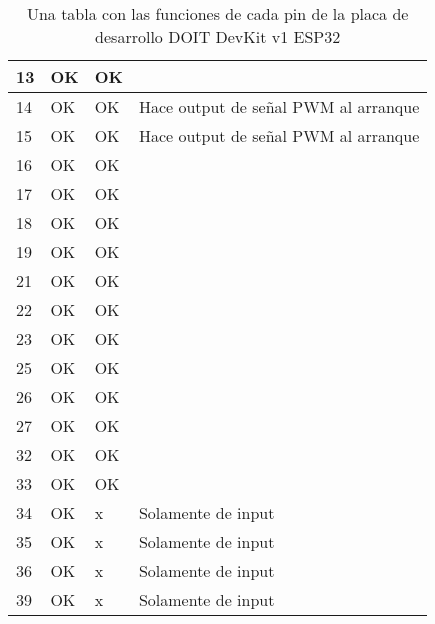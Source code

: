 \documentclass[../informe_krapp.tex]{subfiles}
\begin{document}
\begin{table}[!ht]
\begin{tabular}{|l|l|l|l|}
		13   & OK        & OK     & ~                                          \\ \hline
		14   & OK        & OK     & Hace output de señal PWM al arranque       \\ \hline
		15   & OK        & OK     & Hace output de señal PWM al arranque       \\ \hline
		16   & OK        & OK     & ~                                          \\ \hline
		17   & OK        & OK     & ~                                          \\ \hline
		18   & OK        & OK     & ~                                          \\ \hline
		19   & OK        & OK     & ~                                          \\ \hline
		21   & OK        & OK     & ~                                          \\ \hline
		22   & OK        & OK     & ~                                          \\ \hline
		23   & OK        & OK     & ~                                          \\ \hline
		25   & OK        & OK     & ~                                          \\ \hline
		26   & OK        & OK     & ~                                          \\ \hline
		27   & OK        & OK     & ~                                          \\ \hline
		32   & OK        & OK     & ~                                          \\ \hline
		33   & OK        & OK     & ~                                          \\ \hline
		34   & OK        & x      & Solamente de input                         \\ \hline
		35   & OK        & x      & Solamente de input                         \\ \hline
		36   & OK        & x      & Solamente de input                         \\ \hline
		39   & OK        & x      & Solamente de input                         \\ \hline
	\end{tabular}
	\caption{Una tabla con las funciones de cada pin de la placa de desarrollo
		DOIT DevKit v1 ESP32}
	\label{tabla-pines-esp32}
\end{table}
\end{document}
